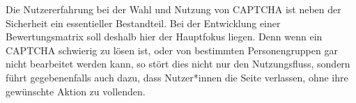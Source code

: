 Die Nutzererfahrung bei der Wahl und Nutzung von CAPTCHA ist neben der Sicherheit ein essentieller Bestandteil.
Bei der Entwicklung einer Bewertungsmatrix soll deshalb hier der Hauptfokus liegen.
Denn wenn ein CAPTCHA schwierig zu lösen ist, oder von bestimmten Personengruppen gar nicht bearbeitet werden kann, so stört dies nicht nur den Nutzungsfluss,
sondern führt gegebenenfalls auch dazu, dass Nutzer*innen die Seite verlassen, ohne ihre gewünschte Aktion zu vollenden. 

